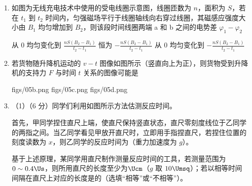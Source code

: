 \documentclass[\gkver]{gaokaozhenti}
\begin{document}
\begin{enumerate}
\item
如图为无线充电技术中使用的受电线圈示意图，线圈匝数为 $n$，面积为 $S$，若在 $t_{1}$ 到 $t_{2}$ 时间内，匀强磁场平行于线圈轴线向右穿过线圈，其磁感应强度大小由 $B_{1}$ 均匀增加到 $B_{2}$，则该段时间线圈两端 a 和 b 之间的电势差 $\varphi_{1}-\varphi_{2}$


{从 0 均匀变化到 $\frac{nS(B_{2}-B_{1})}{t_{2}-t_{1}}$}
{恒为 $-\frac{nS(B_{2}-B_{1})}{t_{2}-t_{1}}$}
{从 0 均匀变化到 $-\frac{nS(B_{2}-B_{1})}{t_{2}-t_{1}}$}


\item
若货物随升降机运动的 $v-t$ 图像如图所示（竖直向上为正），则货物受到升降机的支持力 $F$ 与时间 $t$ 关系的图像可能是


{figs/05b.png}
{figs/05c.png}
{figs/05d.png}


\item
（1）（6 分）同学们利用如图所示方法估测反应时间。

首先，甲同学捏住直尺上端，使直尺保持竖直状态，直尺零刻度线位于乙同学的两指之间。当乙同学看见甲放开直尺时，立即用手指捏直尺，若捏住位置的刻度读数为 $x$，则乙同学的反应时间为（重力加速度为 $g$）。

基于上述原理，某同学用直尺制作测量反应时间的工具，若测量范围为 $0\sim0.4\Us$，则所用直尺的长度至少为$\Ucm$（$g$ 取 $10\Umsq$）；若以相等时间间隔在直尺上对应的长度是的（选填“相等”或“不相等”）。


\end{enumerate}
\end{document}
